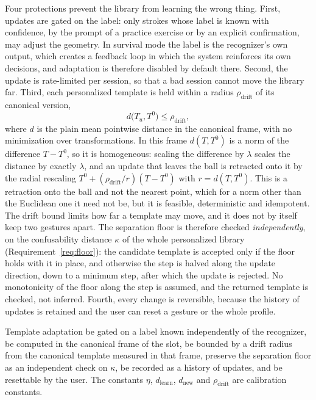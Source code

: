 Four protections prevent the library from learning the wrong thing. First, updates are gated on the label: only strokes whose label is known with confidence, by the prompt of a practice exercise or by an explicit confirmation, may adjust the geometry. In survival mode the label is the recognizer's own output, which creates a feedback loop in which the system reinforces its own decisions, and adaptation is therefore disabled by default there.\evS{} Second, the update is rate-limited per session, so that a bad session cannot move the library far. Third, each personalized template is held within a radius $\rho_{\mathrm{drift}}$ of its canonical version,
\[
d\bigl(T_u,T^{0}\bigr)\le\rho_{\mathrm{drift}},
\]
where $d$ is the plain mean pointwise distance in the canonical frame, with no minimization over transformations. In this frame $d(T,T^0)$ is a norm of the difference $T-T^0$, so it is homogeneous: scaling the difference by $\lambda$ scales the distance by exactly $\lambda$, and an update that leaves the ball is retracted onto it by the radial rescaling $T^0+(\rho_{\mathrm{drift}}/r)(T-T^0)$ with $r=d(T,T^0)$. This is a retraction onto the ball and not the nearest point, which for a norm other than the Euclidean one it need not be, but it is feasible, deterministic and idempotent. The drift bound limits how far a template may move, and it does not by itself keep two gestures apart. The separation floor is therefore checked \emph{independently}, on the confusability distance $\kappa$ of the whole personalized library (Requirement~\ref{req:floor}): the candidate template is accepted only if the floor holds with it in place, and otherwise the step is halved along the update direction, down to a minimum step, after which the update is rejected. No monotonicity of the floor along the step is assumed, and the returned template is checked, not inferred. Fourth, every change is reversible, because the history of updates is retained and the user can reset a gesture or the whole profile.

\begin{requirement}\label{req:bounded-adaptation}
Template adaptation \must{} be gated on a label known independently of the recognizer, \must{} be computed in the canonical frame of the slot, \must{} be bounded by a drift radius from the canonical template measured in that frame, \must{} preserve the separation floor as an independent check on $\kappa$, \must{} be recorded as a history of updates, and \must{} be resettable by the user. The constants $\eta$, $d_{\mathrm{learn}}$, $d_{\mathrm{new}}$ and $\rho_{\mathrm{drift}}$ are calibration constants.\evC{}\evS
\end{requirement}

